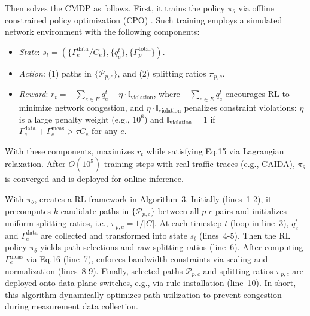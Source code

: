 Then \sysname solves the CMDP as follows. First, it trains the policy $\pi_\theta$ via offline constrained policy optimization (CPO) \cite{achiam2017constrained}. Such training employs a simulated network environment with the following components: 
\begin{itemize}[leftmargin=*,noitemsep]
\item \textit{State}: $s_t = \left( \{ \Gamma_e^{\text{data}}/C_e \}, \{q_e^t\}, \{\Gamma_p^{\text{total}}\} \right)$.
\item \textit{Action}: (1) paths in $\{\mathcal{P}_{p,c}\}$, and (2) splitting ratios $\pi_{p,c}$.
\item \textit{Reward}: $r_t = -\sum_{e \in E} q_e^t - \eta \cdot \mathbb{I}_{\text{violation}}$, where $-\sum_{e \in E} q_e^t$ encourages RL to minimize network congestion, and $\eta \cdot \mathbb{I}_{\text{violation}}$ penalizes constraint violations: $\eta$ is a large penalty weight (e.g., $10^6$) and $\mathbb{I}_{\text{violation}}=1$ if $\Gamma_e^{\text{data}} + \Gamma_e^{\text{meas}} > \tau C_e \text{ for any } e$. 
\end{itemize}

\noindent With these components, \sysname maximizes $r_t$ while satisfying Eq.15 via Lagrangian relaxation. After $O(10^5)$ training steps with real traffic traces (e.g., CAIDA), $\pi_\theta$ is converged and is deployed for online inference.

With $\pi_\theta$, \sysname creates a RL framework in Algorithm~3. Initially (lines~1-2), it precomputes $k$ candidate paths in $\{\mathcal{P}_{p,c}\}$ between all $p$-$c$ pairs and initializes uniform splitting ratios, i.e., $\pi_{p,c} = 1/|C|$. At each timestep $t$ (loop in line~3), $q_e^t$ and $\Gamma_e^{\text{data}}$ are collected and transformed into state $s_t$ (lines~4-5). Then the RL policy $\pi_\theta$ yields path selections and raw splitting ratios (line~6). 
After computing $\Gamma_e^{\text{meas}}$ via Eq.16 (line~7), \sysname enforces bandwidth constraints via scaling and normalization (lines~8-9). 
Finally, selected paths $\mathcal{P}_{p,c}$ and splitting ratios $\pi_{p,c}$ are deployed onto data plane switches, e.g., via rule installation (line~10). In short, this algorithm dynamically optimizes path utilization to prevent congestion during measurement data collection.


